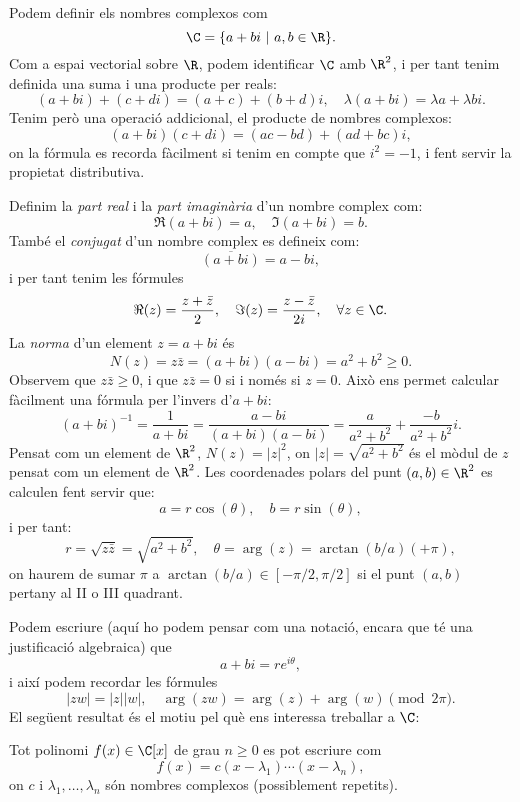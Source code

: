 Podem definir els nombres complexos com
\[
\C =\{a+bi ~|~ a,b\in\R\}.
\]
Com a espai vectorial sobre $\R$, podem identificar $\C$ amb $\R^2$, i per tant tenim definida una suma i una producte per reals:
\[
(a+bi) + (c+di) = (a+c) + (b+d)i, \quad \lambda(a+bi)=\lambda a + \lambda b i.
\]
Tenim però una operació addicional, el producte de nombres complexos:
\[
(a+bi)(c+di) = (ac-bd) + (ad+bc)i,
\]
on la fórmula es recorda fàcilment si tenim en compte que $i^2=-1$, i fent servir la propietat distributiva.

Definim la \emph{part real} i la \emph{part imaginària}  d'un nombre complex com:
\[
\Re(a+bi) = a,\quad \Im(a+bi) = b.
\]
També el \emph{conjugat} d'un nombre complex es defineix com:
\[
\overline{(a+bi)} = a-bi,
\]
i per tant tenim les fórmules
\[
\Re(z) = \frac{z+\bar z}{2},\quad \Im(z)=\frac{z-\bar z}{2i},\quad \forall z\in\C.
\]
La \emph{norma} d'un element $z=a+bi$ és
\[
N(z) = z\bar z = (a+bi)(a-bi) = a^2+b^2\geq 0.
\]
Observem que $z\bar z \geq 0$, i que $z\bar z = 0$ si i només si $z=0$. Això ens permet calcular fàcilment una fórmula per l'invers d'$a+bi$:
\[
(a+bi)^{-1} = \frac{1}{a+bi} = \frac{a-bi}{(a+bi)(a-bi)} = \frac{a}{a^2+b^2}+\frac{-b}{a^2+b^2}i.
\]
Pensat com un element de $\R^2$, $N(z)=|z|^2$, on $|z|=\sqrt{a^2+b^2}$ és el mòdul de $z$ pensat com un element de $\R^2$. Les coordenades polars del punt $(a,b)\in\R^2$ es calculen fent servir que:
\[
a = r\cos(\theta),\quad b = r\sin(\theta),
\]
i per tant:
\[
r = \sqrt{z\bar z}=\sqrt{a^2+b^2},\quad \theta = \arg(z) = \arctan(b/a) (+\pi),
\]
on haurem de sumar $\pi$ a $\arctan(b/a)\in[-\pi/2,\pi/2]$ si el punt $(a,b)$ pertany al II o III quadrant.

Podem escriure (aquí ho podem pensar com una notació, encara que té una justificació algebraica) que
\[
a+bi = re^{i\theta},
\]
i així podem recordar les fórmules
\[
|zw|=|z||w|,\quad \arg(zw)=\arg(z)+\arg(w)\pmod{2\pi}.
\]
El següent resultat és el motiu pel què ens interessa treballar a $\C$:

\begin{teorema}
Tot polinomi $f(x)\in \C[x]$ de grau $n\geq 0$ es pot escriure com
\[
f(x) = c (x-\lambda_1)\cdots (x-\lambda_n),
\]
on $c$ i $\lambda_1,\ldots,\lambda_n$ són nombres complexos (possiblement repetits).
\end{teorema}
